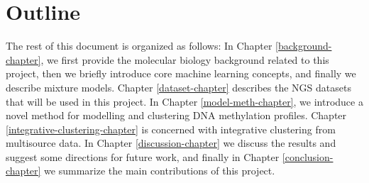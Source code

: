 \section{Outline} \label{outline-intro-l}
The rest of this document is organized as follows: In Chapter \ref{background-chapter}, we first provide the molecular biology background related to this project, then we briefly introduce core machine learning concepts, and finally we describe mixture models. Chapter \ref{dataset-chapter} describes the NGS datasets that will be used in this project. In Chapter \ref{model-meth-chapter}, we introduce a novel method for modelling and clustering DNA methylation profiles. Chapter \ref{integrative-clustering-chapter} is concerned with integrative clustering from multisource data. In Chapter \ref{discussion-chapter} we discuss the results and suggest some directions for future work, and finally in Chapter \ref{conclusion-chapter} we summarize the main contributions of this project. 